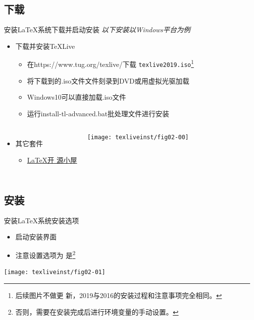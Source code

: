 \documentclass[xcolor=svgnames, t, aspectratio=169]{ctexbeamer}
\begin{document}
\subsection[下载]{下载}
\begin{frame}[t]{安装\LaTeX 系统}{下载并启动安装}
  \stretchon
  \emph{以下安装以Windows平台为例}
  \begin{itemize}
  \item 下载并安装\TeX Live
    \begin{itemize}
    \item 在\url{}{https://www.tug.org/texlive/}下载
      \texttt{texlive2019.iso}\footnote[frame]{后续图片不做更
        新，2019与2016的安装过程和注意事项完全相同。}
    \item 将下载到的.iso文件文件刻录到DVD或用虚拟光驱加载
    \item Windows10可以\alert{直接加载}.iso文件
    \item 运行install-tl-advanced.bat批处理文件进行安装
    \end{itemize}
  \end{itemize}
  \vspace{-3ex}
  \begin{columns}[T]
  \begin{itemize}  
  \item 其它套件
    \begin{itemize}
    \item \href{http://www.latexstudio.net/page/texsoftware}{\LaTeX 开
        源小屋}
    \end{itemize}
  \end{itemize}
  \centering%
  \texttt{[image: texliveinst/fig02-00]}
  \end{columns}
  \stretchoff
\end{frame}
\subsection[安装]{安装}
\begin{frame}[t]{安装\LaTeX 系统}{安装选项}
  \begin{itemize}
  \item 启动安装界面
  \item 注意设置选项为
    \alert{是}\footnote[frame]{否则，需要在安装完成后进行环境变量的手动设置。}
  \end{itemize}
  \centering
  \begin{annotatedFigure}
    {\texttt{[image: texliveinst/fig02-01]}}
  \end{annotatedFigure}  
\end{frame}
\end{document}
